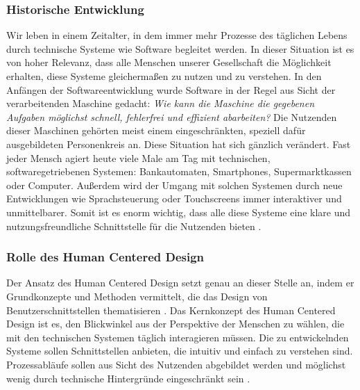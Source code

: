 \subsubsection{Historische Entwicklung}
Wir leben in einem Zeitalter, in dem immer mehr Prozesse des täglichen Lebens
durch technische Systeme wie Software begleitet werden. In dieser Situation ist
es von hoher Relevanz, dass alle Menschen unserer Gesellschaft die Möglichkeit
erhalten, diese Systeme gleichermaßen zu nutzen und zu verstehen. In den Anfängen
der Softwareentwicklung wurde Software in der Regel aus Sicht der
verarbeitenden Maschine gedacht: \textit{Wie kann die Maschine die gegebenen Aufgaben
möglichst schnell, fehlerfrei und effizient abarbeiten?} Die Nutzenden dieser
Maschinen gehörten meist einem eingeschränkten, speziell dafür ausgebildeten
Personenkreis an. Diese Situation hat sich gänzlich verändert. Fast jeder Mensch
agiert heute viele Male am Tag mit technischen, softwaregetriebenen Systemen:
Bankautomaten, Smartphones, Supermarktkassen oder Computer. Außerdem wird der
Umgang mit solchen Systemen durch neue Entwicklungen wie Sprachsteuerung oder
Touchscreens immer interaktiver und unmittelbarer. Somit ist es enorm wichtig,
dass alle diese Systeme eine klare und nutzungsfreundliche Schnittstelle für
die Nutzenden bieten \cite{moserTesting}.

\subsubsection{Rolle des Human Centered Design}
Der Ansatz des Human Centered Design setzt genau an dieser Stelle an, indem er
Grundkonzepte und Methoden vermittelt, die das Design von
Benutzerschnittstellen thematisieren \cite{hcd}. Das Kernkonzept des Human
Centered Design ist es, den Blickwinkel aus der Perspektive der Menschen zu
wählen, die mit den technischen Systemen täglich interagieren müssen. Die zu
entwickelnden Systeme sollen Schnittstellen anbieten, die intuitiv und einfach
zu verstehen sind. Prozessabläufe sollen aus Sicht des Nutzenden abgebildet
werden und möglichst wenig durch technische Hintergründe eingeschränkt
sein \cite{HMI-HCD}.

